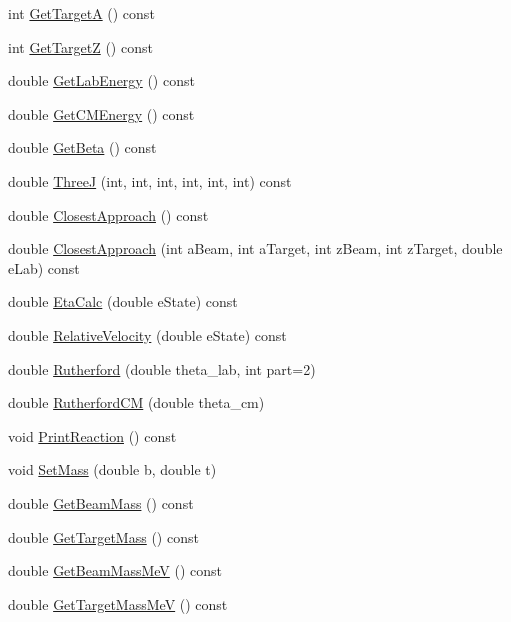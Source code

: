 \begin{DoxyCompactItemize}
\item 
int \hyperlink{classReaction_a88f336aaa15ee243df59dc330c29cd22}{Get\-Target\-A} () const 
\item 
int \hyperlink{classReaction_aaac128357e69dd4172b91e8bc69d045a}{Get\-Target\-Z} () const 
\item 
double \hyperlink{classReaction_adfbcb4fdbe0ee30770cbdb507e5a0779}{Get\-Lab\-Energy} () const 
\item 
double \hyperlink{classReaction_ae27e7830b4d1c5e9023913c7665dc94d}{Get\-C\-M\-Energy} () const 
\item 
double \hyperlink{classReaction_ac735ba532b0e9dae75ec087b6ea76162}{Get\-Beta} () const 
\item 
double \hyperlink{classReaction_ae139c25e4a30dd1251a32ab6d0d5538c}{Three\-J} (int, int, int, int, int, int) const 
\item 
double \hyperlink{classReaction_a73c8c0ec22c962ab3ece453836e074fa}{Closest\-Approach} () const 
\item 
double \hyperlink{classReaction_a27a288df5efb87fb7c4b31702d313bba}{Closest\-Approach} (int a\-Beam, int a\-Target, int z\-Beam, int z\-Target, double e\-Lab) const 
\item 
double \hyperlink{classReaction_ac17706fded988c9a5c126de025567a6b}{Eta\-Calc} (double e\-State) const 
\item 
double \hyperlink{classReaction_aaa0710c49d0b08575aa34ba1feefa00a}{Relative\-Velocity} (double e\-State) const 
\item 
double \hyperlink{classReaction_ab9e972e6be388fee7c9a38652991052c}{Rutherford} (double theta\-\_\-lab, int part=2)
\item 
double \hyperlink{classReaction_ac417a6e5c5809dc7ff6af8b52bc98f01}{Rutherford\-C\-M} (double theta\-\_\-cm)
\item 
void \hyperlink{classReaction_aa417a6fcfd67b4fcf3b1c437e255bf48}{Print\-Reaction} () const 
\item 
void \hyperlink{classReaction_a107e59773c72a5e780e688e45093de15}{Set\-Mass} (double b, double t)
\item 
double \hyperlink{classReaction_a9fefc9765c6a0b92a66044ec3102eb71}{Get\-Beam\-Mass} () const 
\item 
double \hyperlink{classReaction_abd899bbe9008abeab0a7d59a148c216d}{Get\-Target\-Mass} () const 
\item 
double \hyperlink{classReaction_a44c4237ac219380c45c1f8aba767ea9e}{Get\-Beam\-Mass\-Me\-V} () const 
\item 
double \hyperlink{classReaction_a3f53916a2f5cedbdca7ef3496d940a29}{Get\-Target\-Mass\-Me\-V} () const 

\end{DoxyCompactItemize}
